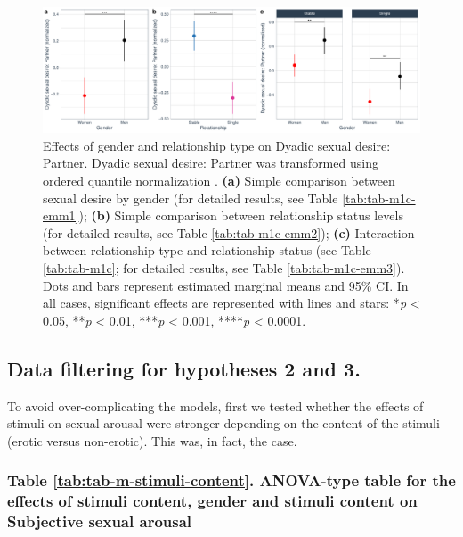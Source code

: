 \documentclass[
  bookmarksnumbered]{article}
\begin{document}
\begin{figure}
\centering
\includegraphics{Sexual_Desire_Arousal_V2_files/figure-latex/fig-h1c-1.pdf}
\caption{\label{fig:fig-h1c}Effects of gender and relationship type on Dyadic sexual desire: Partner. Dyadic sexual desire: Partner was transformed using ordered quantile normalization \autocite{petersonOrderedQuantileNormalization2020a}. \textbf{(a)} Simple comparison between sexual desire by gender (for detailed results, see Table \ref{tab:tab-m1c-emm1}); \textbf{(b)} Simple comparison between relationship status levels (for detailed results, see Table \ref{tab:tab-m1c-emm2}); \textbf{(c)} Interaction between relationship type and relationship status (see Table \ref{tab:tab-m1c}; for detailed results, see Table \ref{tab:tab-m1c-emm3}). Dots and bars represent estimated marginal means and 95\% CI. In all cases, significant effects are represented with lines and stars: *\emph{p} \textless{} 0.05, **\emph{p} \textless{} 0.01, ***\emph{p} \textless{} 0.001, ****\emph{p} \textless{} 0.0001.}
\end{figure}

\subsection{Data filtering for hypotheses 2 and 3.}\label{datfil2and3}

To avoid over-complicating the models, first we tested whether the effects of stimuli on sexual arousal were stronger depending on the content of the stimuli (erotic versus non-erotic). This was, in fact, the case.

\subsubsection{Table \ref{tab:tab-m-stimuli-content}. ANOVA-type table for the effects of stimuli content, gender and stimuli content on Subjective sexual arousal}\label{table-reftabtab-m-stimuli-content.-anova-type-table-for-the-effects-of-stimuli-content-gender-and-stimuli-content-on-subjective-sexual-arousal}
\end{document}
